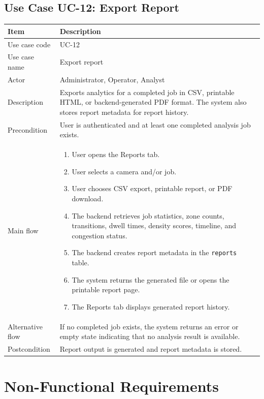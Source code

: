 \documentclass[12pt,a4paper]{report}
\begin{document}
\subsection{Use Case UC-12: Export Report}
\begin{longtable}{|p{3.6cm}|p{10.4cm}|}
\hline
\rowcolor{HeaderBlue}\textbf{Item} & \textbf{Description} \\
\hline
Use case code & UC-12 \\
\hline
Use case name & Export report \\
\hline
Actor & Administrator, Operator, Analyst \\
\hline
Description & Exports analytics for a completed job in CSV, printable HTML, or backend-generated PDF format. The system also stores report metadata for report history. \\
\hline
Precondition & User is authenticated and at least one completed analysis job exists. \\
\hline
Main flow &
\begin{enumerate}
    \item User opens the Reports tab.
    \item User selects a camera and/or job.
    \item User chooses CSV export, printable report, or PDF download.
    \item The backend retrieves job statistics, zone counts, transitions, dwell times, density scores, timeline, and congestion status.
    \item The backend creates report metadata in the \texttt{reports} table.
    \item The system returns the generated file or opens the printable report page.
    \item The Reports tab displays generated report history.
\end{enumerate} \\
\hline
Alternative flow & If no completed job exists, the system returns an error or empty state indicating that no analysis result is available. \\
\hline
Postcondition & Report output is generated and report metadata is stored. \\
\hline
\end{longtable}

\section{Non-Functional Requirements}
\end{document}

